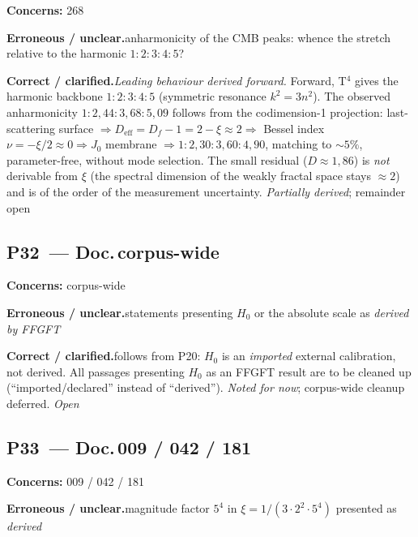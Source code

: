 \noindent\textbf{Concerns:} 268


\smallskip\noindent\textbf{Erroneous / unclear.}\quad anharmonicity of the CMB peaks: whence the stretch relative to the harmonic $1:2:3:4:5$?


\smallskip\noindent\textbf{Correct / clarified.}\quad \emph{Leading behaviour derived forward.} Forward, T$^4$ gives the harmonic backbone $1:2:3:4:5$ (symmetric resonance $k^2=3n^2$). The observed anharmonicity $1:2{,}44:3{,}68:5{,}09$ follows from the codimension-1 projection: last-scattering surface $\Rightarrow D_\mathrm{eff}=D_f-1=2-\xi\approx2 \Rightarrow$ Bessel index $\nu=-\xi/2\approx0 \Rightarrow J_0$ membrane $\Rightarrow 1:2{,}30:3{,}60:4{,}90$, matching to $\sim5\%$, parameter-free, without mode selection. The small residual ($D\approx1{,}86$) is \emph{not} derivable from $\xi$ (the spectral dimension of the weakly fractal space stays $\approx2$) and is of the order of the measurement uncertainty. \emph{Partially derived}; remainder open


\medskip


\subsection*{P32~--- Doc.\,corpus-wide}

\noindent\textbf{Concerns:} corpus-wide


\smallskip\noindent\textbf{Erroneous / unclear.}\quad statements presenting $H_0$ or the absolute scale as \emph{derived by FFGFT}


\smallskip\noindent\textbf{Correct / clarified.}\quad follows from P20: $H_0$ is an \emph{imported} external calibration, not derived. All passages presenting $H_0$ as an FFGFT result are to be cleaned up (\enquote{imported/declared} instead of \enquote{derived}). \emph{Noted for now}; corpus-wide cleanup deferred. \emph{Open}


\medskip


\subsection*{P33~--- Doc.\,009 / 042 / 181}

\noindent\textbf{Concerns:} 009 / 042 / 181


\smallskip\noindent\textbf{Erroneous / unclear.}\quad magnitude factor $5^4$ in $\xi = 1/(3\cdot2^2\cdot5^4)$ presented as \emph{derived}


